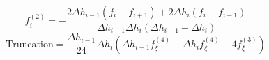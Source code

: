 \begin{equation} 
f^{{(2)}}_{i} = - \frac{2 \Delta h_{{i-1}} \left(f_{i} - f_{{i+1}}\right) + 2 \Delta h_{{i}} \left(f_{i} - f_{{i-1}}\right)}{\Delta h_{{i-1}} \Delta h_{{i}} \left(\Delta h_{{i-1}} + \Delta h_{{i}}\right)}
 \end{equation}\begin{equation} 
\text{Truncation} = \frac{\Delta h_{{i-1}}}{24} \Delta h_{{i}} \left(\Delta h_{{i-1}} f^{{(4)}}_{{\xi}} - \Delta h_{{i}} f^{{(4)}}_{{\xi}} - 4 f^{{(3)}}_{{\xi}}\right)
 \end{equation}